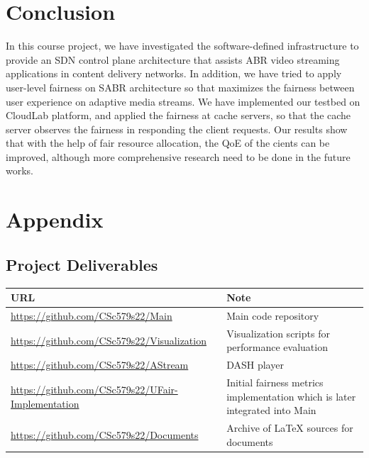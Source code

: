 \documentclass[12pt]{article}
\begin{document}
\section{Conclusion}
In this course project, we have investigated the software-defined infrastructure to provide an SDN control plane architecture that assists ABR video streaming applications in content delivery networks. In addition, we have tried to apply user-level fairness on SABR architecture so that maximizes the fairness between user experience on adaptive media streams. We have implemented our testbed on CloudLab platform, and applied the fairness at cache servers, so that the cache server observes the fairness in responding the client requests. Our results show that with the help of fair resource allocation, the QoE of the cients can be improved, although more comprehensive research need to be done in the future works.

\printbibliography[heading=bibnumbered]

\newpage

\section{Appendix}

\subsection{Project Deliverables}
\begin{center}
\begin{tabular}{ | m{20em} | m{18em} | } 
\hline
URL                                               & Note                                                                       \\ 
\hline
\url{https://github.com/CSc579s22/Main}                 & Main code repository                                                       \\ 
\hline
\url{https://github.com/CSc579s22/Visualization}        & Visualization scripts for performance evaluation                           \\ 
\hline
\url{https://github.com/CSc579s22/AStream}             & DASH player                                                                \\ 
\hline
\url{https://github.com/CSc579s22/UFair-Implementation} & Initial fairness metrics implementation which is later integrated into Main  \\ 
\hline
\url{https://github.com/CSc579s22/Documents}           & Archive of LaTeX sources for documents                                                \\
\hline
\end{tabular}
\end{center}
\end{document}
